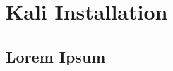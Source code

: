 \documentclass[../wifi-security.tex]{subfiles}
\begin{document}
\chapter{Kali Installation}



\section{Lorem Ipsum}

\end{document}
